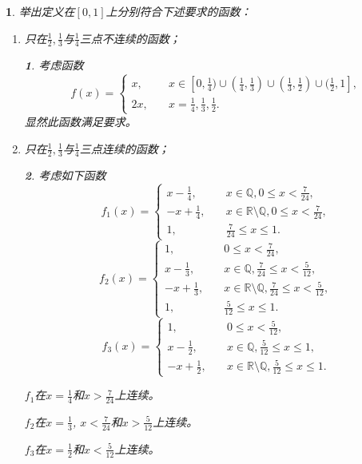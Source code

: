 \documentclass[utf8]{book}
\newtheorem{example}{}[section]             %
\newtheorem{solution}{}
\begin{document}
\begin{example}
举出定义在$[0,1]$上分别符合下述要求的函数：
\renewcommand\labelenumi{\normalfont(\theenumi)}
\begin{enumerate}
\item 只在$\frac{1}{2},\frac{1}{3}$与$\frac{1}{4}$三点不连续的函数；
\begin{solution}考虑函数
$$f(x)=
\begin{cases}
x, \quad &x\in[0,\frac{1}{4})\cup(\frac{1}{4},\frac{1}{3})\cup(\frac{1}{3},\frac{1}{2})\cup(\frac{1}{2},1],\\
2x, \quad&x=\frac{1}{4},\frac{1}{3},\frac{1}{2}.
\end{cases}$$
显然此函数满足要求。
\end{solution}
\item 只在$\frac{1}{2},\frac{1}{3}$与$\frac{1}{4}$三点连续的函数；
\begin{solution}考虑如下函数
$$
f_1(x)=
\begin{cases}
x-\frac{1}{4},\quad &x\in\mathbb{Q}, 0\leq x < \frac{7}{24},\\
-x+\frac{1}{4}, \quad &x\in\mathbb{R}\setminus\mathbb{Q}, 0\leq x< \frac{7}{24},\\
1, \quad &\frac{7}{24}\leq x\leq 1.
\end{cases}
$$
$$
f_2(x)=
\begin{cases}
1,\quad &0\leq x <\frac{7}{24},\\
x-\frac{1}{3},\quad &x\in\mathbb{Q}, \frac{7}{24}\leq x < \frac{5}{12},\\
-x+\frac{1}{3}, \quad &x\in\mathbb{R}\setminus\mathbb{Q}, \frac{7}{24}\leq x < \frac{5}{12},\\
1, \quad &\frac{5}{12}\leq x\leq 1.
\end{cases}
$$
$$
f_3(x)=
\begin{cases}
1,\quad &0\leq  x < \frac{5}{12},\\
x-\frac{1}{2},\quad &x\in\mathbb{Q},  \frac{5}{12}\leq x \leq 1,\\
-x+\frac{1}{2}, \quad &x\in\mathbb{R}\setminus\mathbb{Q}, \frac{5}{12}\leq x\leq 1.
\end{cases}
$$

$f_1$在$x=\frac{1}{4}$和$x>\frac{7}{24}$上连续。

$f_2$在$x=\frac{1}{3}$, $x<\frac{7}{24}$和$x>\frac{5}{12}$上连续。

$f_3$在$x=\frac{1}{2}$和$x < \frac{5}{12}$上连续。


\end{solution}
\end{enumerate}
\end{example}
\end{document}
